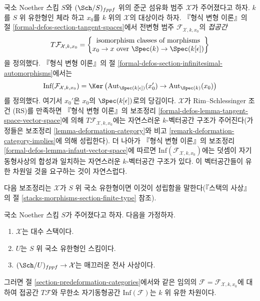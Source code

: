 \noindent
국소 Noether 스킴 $S$와 $(\Sch/S)_{fppf}$ 위의 준군 섬유화 범주
$\mathcal{X}$가 주어졌다고 하자. $k$를 $S$ 위 유한형인 체라 하고
$x_0$를 $k$ 위의 $\mathcal{X}$의 대상이라 하자. 『형식 변형 이론』의
절 \ref{formal-defos-section-tangent-spaces}에서 전변형 범주
$\mathcal{F}_{\mathcal{X}, k, x_0}$의 {\it 접공간}
\begin{equation}
\label{equation-tangent-space}
T\mathcal{F}_{\mathcal{X}, k, x_0} =
\left\{
\begin{matrix}
\text{isomorphism classes of morphisms}\\
x_0 \to x\text{ over }\Spec(k) \to \Spec(k[\epsilon])
\end{matrix}
\right\}
\end{equation}
을 정의했다. 『형식 변형 이론』의 절
\ref{formal-defos-section-infinitesimal-automorphisms}에서는
\begin{equation}
\label{equation-infinitesimal-automorphisms}
\text{Inf}(\mathcal{F}_{\mathcal{X}, k, x_0}) =
\Ker\left(
\text{Aut}_{\Spec(k[\epsilon])}(x'_0) \to \text{Aut}_{\Spec(k)}(x_0)
\right)
\end{equation}
를 정의했다. 여기서 $x_0'$은 $x_0$의 $\Spec(k[\epsilon])$로의 당김이다.
$\mathcal{X}$가 Rim--Schlessinger 조건 (RS)를 만족하면 『형식 변형 이론』의
보조정리 \ref{formal-defos-lemma-tangent-space-vector-space}에 의해
$T\mathcal{F}_{\mathcal{X}, k, x_0}$에는 자연스러운 $k$-벡터공간 구조가
주어진다(가정들은 보조정리 \ref{lemma-deformation-category}와 비고
\ref{remark-deformation-category-implies}에 의해 성립한다). 더 나아가
『형식 변형 이론』의 보조정리
\ref{formal-defos-lemma-infaut-vector-space}에 따르면
$\text{Inf}(\mathcal{F}_{\mathcal{X}, k, x_0})$에는 덧셈이 자기동형사상의
합성과 일치하는 자연스러운 $k$-벡터공간 구조가 있다. 이 벡터공간들이
유한 차원일 것을 요구하는 것이 자연스럽다.

\medskip\noindent
다음 보조정리는 $\mathcal{X}$가 $S$ 위 국소 유한형이면 이것이 성립함을
말한다(『스택의 사상』의 절
\ref{stacks-morphisms-section-finite-type} 참조).

\begin{lemma}
\label{lemma-finite-dimension}
국소 Noether 스킴 $S$가 주어졌다고 하자. 다음을 가정하자.
\begin{enumerate}
\item $\mathcal{X}$는 대수 스택이다.
\item $U$는 $S$ 위 국소 유한형인 스킴이다.
\item $(\Sch/U)_{fppf} \to \mathcal{X}$는 매끄러운 전사 사상이다.
\end{enumerate}
그러면 절 \ref{section-predeformation-categories}에서와 같은 임의의
$\mathcal{F} = \mathcal{F}_{\mathcal{X}, k, x_0}$에 대하여 접공간
$T\mathcal{F}$와 무한소 자기동형공간 $\text{Inf}(\mathcal{F})$는
$k$ 위 유한 차원이다.
\end{lemma}

